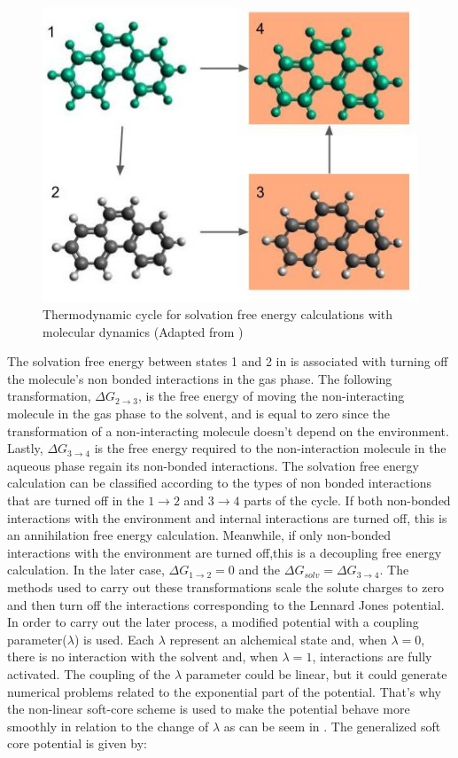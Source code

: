 \begin{figure}[th]
	\centering
	\includegraphics[scale=0.6]{Figures/cicclotermo.jpg}
	\caption{Thermodynamic cycle for solvation free energy calculations with molecular dynamics (Adapted from )}
	\label{thermcy}
\end{figure}

The solvation free energy between states 1 and 2 in  is associated with turning off the molecule's non bonded interactions in the gas phase. The following transformation, $\Delta G_{2 \rightarrow 3}$, is the free energy of moving the non-interacting molecule in the gas phase to the solvent, and is equal to zero since the transformation of a non-interacting molecule doesn't depend on the environment. Lastly, $\Delta G_{3 \rightarrow 4}$ is the free energy required to the non-interaction molecule in the aqueous phase regain its non-bonded interactions.  The solvation free energy calculation can be classified according to the types of non bonded interactions that are turned off in the $1 \rightarrow 2$ and $ 3 \rightarrow 4$ parts of the cycle. If both non-bonded interactions with the environment and internal interactions are turned off, this is an annihilation free energy calculation. Meanwhile, if only non-bonded interactions with the environment are turned off,this is a decoupling free energy calculation. In the later case, $\Delta G_{1 \rightarrow 2} = 0$ and the $\Delta G_{solv} = \Delta G_{3 \rightarrow 4} $. The methods used to carry out these transformations scale the solute charges to zero and then turn off the interactions corresponding to the Lennard Jones potential. In order to carry out the later process, a modified potential with a coupling parameter($\lambda$) is used. Each $\lambda$ represent an alchemical state and, when $\lambda=0$, there is no interaction with the solvent and, when $\lambda=1$, interactions are fully activated. The coupling of the $\lambda$ parameter could be linear, but it could generate numerical problems related to the exponential part of the potential.  That's why the non-linear soft-core scheme \cite{beutler1994} is used to make the potential behave more smoothly in relation to the change of $\lambda$ as can be seem in . The generalized soft core potential is given by:

